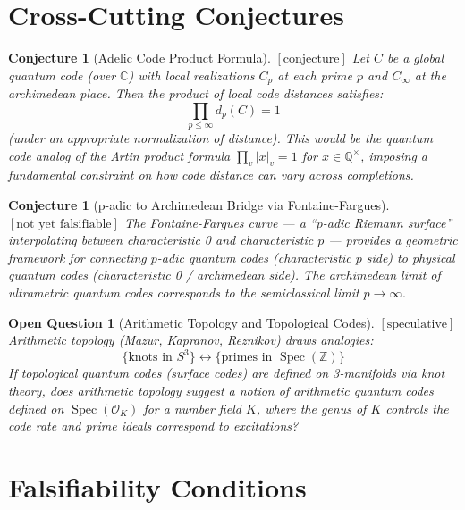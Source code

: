 \documentclass[12pt]{article}
\newtheorem{conjecture}[definition]{Conjecture}
\newtheorem{question}[definition]{Open Question}
\theoremstyle{remark}
\begin{document}
\section{Cross-Cutting Conjectures}

\begin{conjecture}[Adelic Code Product Formula]
$[\text{conjecture}]$
Let $C$ be a global quantum code (over $\mathbb{C}$) with local realizations
$C_p$ at each prime $p$ and $C_\infty$ at the archimedean place. Then the
product of local code distances satisfies:
\[
\prod_{p \leq \infty} d_p(C) = 1
\]
(under an appropriate normalization of distance). This would be the quantum
code analog of the Artin product formula $\prod_v |x|_v = 1$ for
$x \in \mathbb{Q}^\times$, imposing a fundamental constraint on how code
distance can vary across completions.
\end{conjecture}

\begin{conjecture}[p-adic to Archimedean Bridge via Fontaine-Fargues]
$[\text{not yet falsifiable}]$
The Fontaine-Fargues curve — a ``$p$-adic Riemann surface'' interpolating
between characteristic 0 and characteristic $p$ — provides a geometric
framework for connecting $p$-adic quantum codes (characteristic $p$ side)
to physical quantum codes (characteristic 0 / archimedean side). The
archimedean limit of ultrametric quantum codes corresponds to the
semiclassical limit $p \to \infty$.
\end{conjecture}

\begin{question}[Arithmetic Topology and Topological Codes]
$[\text{speculative}]$
Arithmetic topology (Mazur, Kapranov, Reznikov) draws analogies:
\[
\{\text{knots in } S^3\} \longleftrightarrow
\{\text{primes in } \operatorname{Spec}(\mathbb{Z})\}
\]
If topological quantum codes (surface codes) are defined on 3-manifolds
via knot theory, does arithmetic topology suggest a notion of
\emph{arithmetic quantum codes} defined on $\operatorname{Spec}(\mathcal{O}_K)$
for a number field $K$, where the genus of $K$ controls the code rate
and prime ideals correspond to excitations?
\end{question}

\section{Falsifiability Conditions}
\end{document}
